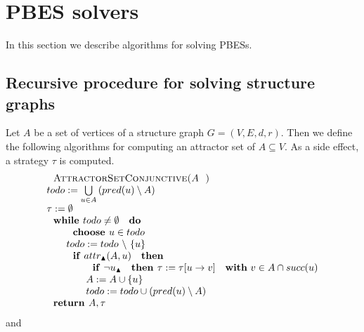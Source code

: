                       

\section{PBES solvers}

In this section we describe algorithms for solving PBESs.

\subsection{Recursive procedure for solving structure graphs}

Let $A$ be a set of vertices of a structure graph $G=(V,E,d,r)$. Then we
define the following algorithms for computing an attractor set of $%
A\subseteq V$. As a side effect, a strategy $\tau $ is computed.%
\begin{equation*}
\begin{array}{l}
\text{\textsc{AttractorSetConjunctive(}}A\text{\textsc{)}} \\ 
todo:=\bigcup\limits_{u\in A}\left( pred(u)\setminus A\right)  \\ 
\tau :=\emptyset  \\ 
\text{\textbf{while }}todo\neq \emptyset \text{ \textbf{do}} \\ 
\qquad \text{\textbf{choose }}u\in todo \\ 
\qquad todo:=todo\ \backslash \ \{u\} \\ 
\qquad \text{\textbf{if} }attr_{\blacktriangle }(A,u)\text{ \textbf{then}}
\\ 
\qquad \qquad \text{\textbf{if} }\lnot u_{\blacktriangle }\text{ \textbf{%
then }}\tau :=\tau \lbrack u\rightarrow v]\text{ \textbf{with} }v\in A\cap
succ(u) \\ 
\qquad \qquad A:=A\cup \{u\} \\ 
\qquad \qquad todo:=todo\cup \left( pred(u)\setminus A\right)  \\ 
\text{\textbf{return }}A,\tau 
\end{array}%
\end{equation*}%
and%
